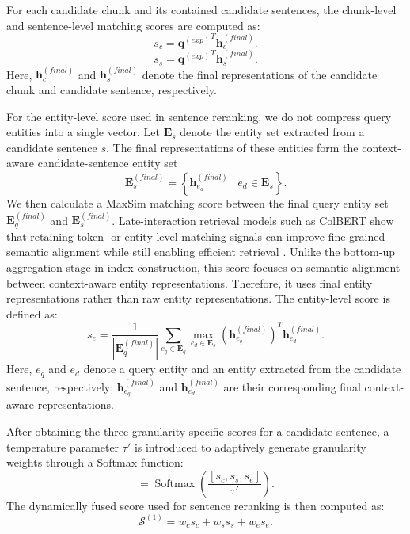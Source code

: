 \documentclass[a4paper,fleqn]{cas-dc}
\begin{document}
For each candidate chunk and its contained candidate sentences, the chunk-level and sentence-level matching scores are computed as:
\begin{equation}
s_{c}
=
{\mathbf{q}^{(exp)}}^{T}
\mathbf{h}_{c}^{(final)}.
\label{eq:chunk_level_matching_score}
\end{equation}
\begin{equation}
s_{s}
=
{\mathbf{q}^{(exp)}}^{T}
\mathbf{h}_{s}^{(final)}.
\label{eq:sentence_level_matching_score}
\end{equation}
Here, $\mathbf{h}_{c}^{(final)}$ and $\mathbf{h}_{s}^{(final)}$ denote the final representations of the candidate chunk and candidate sentence, respectively.

For the entity-level score used in sentence reranking, we do not compress query entities into a single vector. Let $\mathbf{E}_{s}$ denote the entity set extracted from a candidate sentence $s$. The final representations of these entities form the context-aware candidate-sentence entity set
\begin{equation}
\mathbf{E}_{s}^{(final)}
=
\left\{
\mathbf{h}_{e_d}^{(final)}
\mid e_d \in \mathbf{E}_{s}
\right\}.
\label{eq:candidate_sentence_entity_set}
\end{equation}
We then calculate a MaxSim matching score between the final query entity set $\mathbf{E}_{q}^{(final)}$ and $\mathbf{E}_{s}^{(final)}$. Late-interaction retrieval models such as ColBERT show that retaining token- or entity-level matching signals can improve fine-grained semantic alignment while still enabling efficient retrieval \citep{Santhanam2022ColBERTv2}. Unlike the bottom-up aggregation stage in index construction, this score focuses on semantic alignment between context-aware entity representations. Therefore, it uses final entity representations rather than raw entity representations. The entity-level score is defined as:
\begin{equation}
s_{e}
=
\frac{1}{|\mathbf{E}_{q}^{(final)}|}
\sum_{e_q \in \mathbf{E}_{q}}
\max_{e_d \in \mathbf{E}_{s}}
\left(\mathbf{h}_{e_q}^{(final)}\right)^{T}
\mathbf{h}_{e_d}^{(final)}.
\label{eq:entity_level_matching_score}
\end{equation}
Here, $e_q$ and $e_d$ denote a query entity and an entity extracted from the candidate sentence, respectively; $\mathbf{h}_{e_q}^{(final)}$ and $\mathbf{h}_{e_d}^{(final)}$ are their corresponding final context-aware representations.

After obtaining the three granularity-specific scores for a candidate sentence, a temperature parameter $\tau'$ is introduced to adaptively generate granularity weights through a Softmax function:
\begin{equation}
[w_{c},w_{s},w_{e}]
=
\operatorname{Softmax}
\left(
\frac{[s_{c},s_{s},s_{e}]}{\tau'}
\right).
\end{equation}
The dynamically fused score used for sentence reranking is then computed as:
\begin{equation}
\mathcal{S}^{(1)}
=
w_{c}s_{c}
+
w_{s}s_{s}
+
w_{e}s_{e}.
\end{equation}
\end{document}
